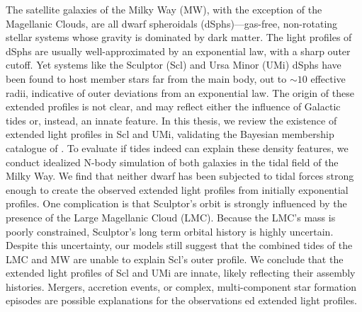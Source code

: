 The satellite galaxies of the Milky Way (MW), with the exception of the
Magellanic Clouds, are all dwarf spheroidals (dSphs)---gas-free,
non-rotating stellar systems whose gravity is dominated by dark matter.
The light profiles of dSphs are usually well-approximated by an
exponential law, with a sharp outer cutoff. Yet systems like the
Sculptor (Scl) and Ursa Minor (UMi) dSphs have been found to host member
stars far from the main body, out to \(\sim10\) effective radii,
indicative of outer deviations from an exponential law. The origin of
these extended profiles is not clear, and may reflect either the
influence of Galactic tides or, instead, an innate feature. In this
thesis, we review the existence of extended light profiles in Scl and
UMi, validating the Bayesian membership catalogue of
\citet{jensen+2024}. To evaluate if tides indeed can explain these
density features, we conduct idealized N-body simulation of both
galaxies in the tidal field of the Milky Way. We find that neither dwarf
has been subjected to tidal forces strong enough to create the observed
extended light profiles from initially exponential profiles. One
complication is that Sculptor's orbit is strongly influenced by the
presence of the Large Magellanic Cloud (LMC). Because the LMC's mass is
poorly constrained, Sculptor's long term orbital history is highly
uncertain. Despite this uncertainty, our models still suggest that the
combined tides of the LMC and MW are unable to explain Scl's outer
profile. We conclude that the extended light profiles of Scl and UMi are
innate, likely reflecting their assembly histories. Mergers, accretion
events, or complex, multi-component star formation episodes are possible
explanations for the observations ed extended light profiles.
